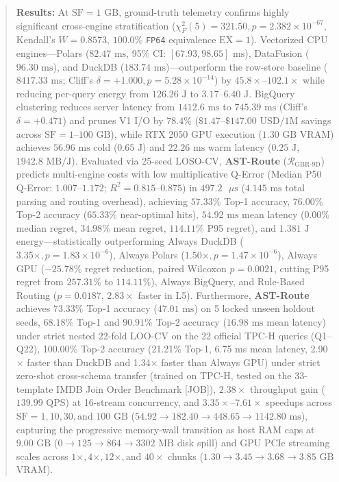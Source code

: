 \documentclass[10pt,a4paper]{article}
\begin{document}
\begin{quote}
\textbf{Results:} At $\text{SF}=1\text{ GB}$, ground-truth telemetry confirms highly significant cross-engine stratification ($\chi^2_F(5) = 321.50, p = 2.382 \times 10^{-67}$, Kendall's $W = 0.8573$, $100.0\%$ \texttt{FP64} equivalence $\text{EX}=1$). Vectorized CPU engines---Polars ($82.47\text{ ms}$, 95\% CI: $[67.93, 98.65]\text{ ms}$), DataFusion ($96.30\text{ ms}$), and DuckDB ($183.74\text{ ms}$)---outperform the row-store baseline ($8417.33\text{ ms}$; Cliff's $\delta = +1.000, p = 5.28 \times 10^{-14}$) by $45.8\times\text{--}102.1\times$ while reducing per-query energy from $126.26\text{ J}$ to $3.17\text{--}6.40\text{ J}$. BigQuery clustering reduces server latency from $1412.6\text{ ms}$ to $745.39\text{ ms}$ (Cliff's $\delta = +0.471$) and prunes V1 I/O by $78.4\%$ ($\$1.47\text{--}\$147.00\text{ USD/1M}$ savings across $\text{SF}=1\text{--}100\text{ GB}$), while RTX 2050 GPU execution ($1.30\text{ GB}$ VRAM) achieves $56.96\text{ ms}$ cold ($0.65\text{ J}$) and $22.26\text{ ms}$ warm latency ($0.25\text{ J}$, $1942.8\text{ MB/J}$). Evaluated via 25-seed LOSO-CV, \textbf{AST-Route} ($\mathcal{R}_{\text{GBR-9D}}$) predicts multi-engine costs with low multiplicative Q-Error (Median P50 Q-Error: $1.007\text{--}1.172$; $R^2 = 0.815\text{--}0.875$) in $497.2\text{ }\mu\text{s}$ ($4.145\text{ ms}$ total parsing and routing overhead), achieving $57.33\%$ Top-1 accuracy, $76.00\%$ Top-2 accuracy ($65.33\%$ near-optimal hits), $54.92\text{ ms}$ mean latency ($0.00\%$ median regret, $34.98\%$ mean regret, $114.11\%$ P95 regret), and $1.381\text{ J}$ energy---statistically outperforming Always DuckDB ($3.35\times, p=1.83\times 10^{-6}$), Always Polars ($1.50\times, p=1.47\times 10^{-6}$), Always GPU ($-25.78\%$ regret reduction, paired Wilcoxon $p=0.0021$, cutting P95 regret from $257.31\%$ to $114.11\%$), Always BigQuery, and Rule-Based Routing ($p = 0.0187$, $2.83\times$ faster in L5). Furthermore, \textbf{AST-Route} achieves $73.33\%$ Top-1 accuracy ($47.01\text{ ms}$) on 5 locked unseen holdout seeds, $68.18\%$ Top-1 and $90.91\%$ Top-2 accuracy ($16.98\text{ ms}$ mean latency) under strict nested 22-fold LOO-CV on the 22 official TPC-H queries (Q1--Q22), 100.00\% Top-2 accuracy (21.21\% Top-1, 6.75 ms mean latency, 2.90$\times$ faster than DuckDB and 1.34$\times$ faster than Always GPU) under strict zero-shot cross-schema transfer (trained on TPC-H, tested on the 33-template IMDB Join Order Benchmark [JOB]), $2.38\times$ throughput gain ($139.99\text{ QPS}$) at 16-stream concurrency, and $3.35\times\text{--}7.61\times$ speedups across $\text{SF}=1, 10, 30, \text{and } 100\text{ GB}$ ($54.92 \rightarrow 182.40 \rightarrow 448.65 \rightarrow 1142.80\text{ ms}$), capturing the progressive memory-wall transition as host RAM caps at $9.00\text{ GB}$ ($0 \rightarrow 125 \rightarrow 864 \rightarrow 3302\text{ MB}$ disk spill) and GPU PCIe streaming scales across $1\times, 4\times, 12\times, \text{and } 40\times$ chunks ($1.30 \rightarrow 3.45 \rightarrow 3.68 \rightarrow 3.85\text{ GB}$ VRAM).\\[0.25em]

\end{quote}
\end{document}
